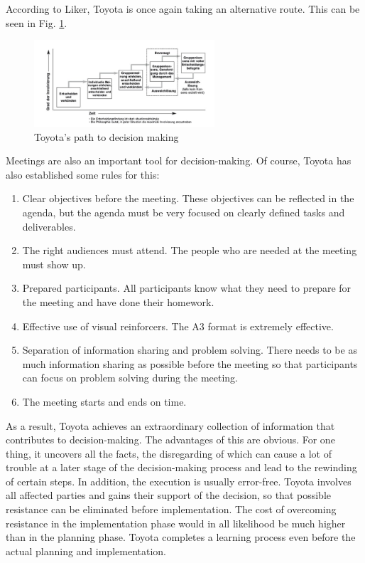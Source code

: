 \documentclass[a4paper,12pt]{scrartcl}
\begin{document}
According to Liker, Toyota is once again taking an alternative route. This can be seen in Fig. \ref{Entscheidung}.


\begin{figure}[h] 
  \centering
     \includegraphics[width=0.6\textwidth]{Entscheidung.png}
  \caption{Toyota's path to decision making}
  \label{Entscheidung}
\end{figure}

\clearpage

Meetings are also an important tool for decision-making. Of course, Toyota has also established some rules for this:

\begin{enumerate}
    \item Clear objectives before the meeting. These objectives can be reflected in the agenda, but the agenda must be very focused on clearly defined tasks and deliverables.
    \item The right audiences must attend. The people who are needed at the meeting must show up.
    \item Prepared participants. All participants know what they need to prepare for the meeting and have done their homework.
    \item Effective use of visual reinforcers. The A3 format is extremely effective.
    \item Separation of information sharing and problem solving. There needs to be as much information sharing as possible before the meeting so that participants can focus on problem solving during the meeting.
    \item The meeting starts and ends on time.
\end{enumerate}

As a result, Toyota achieves an extraordinary collection of information that contributes to decision-making. The advantages of this are obvious. For one thing, it uncovers all the facts, the disregarding of which can cause a lot of trouble at a later stage of the decision-making process and lead to the rewinding of certain steps. In addition, the execution is usually error-free. Toyota involves all affected parties and gains their support of the decision, so that possible resistance can be eliminated before implementation. The cost of overcoming resistance in the implementation phase would in all likelihood be much higher than in the planning phase. Toyota completes a learning process even before the actual planning and implementation.
\end{document}
